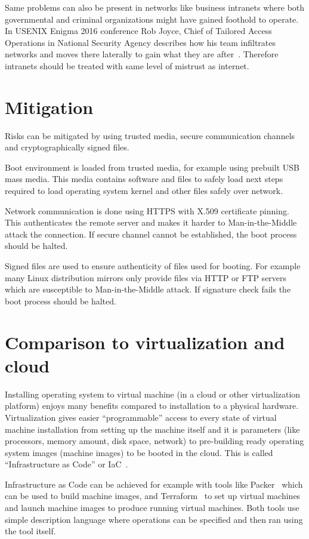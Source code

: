 Same problems can also be present in networks like business intranets
where both governmental and criminal organizations might have gained
foothold to operate. In USENIX Enigma 2016 conference Rob Joyce, Chief
of Tailored Access Operations in National Security Agency describes
how his team infiltrates networks and moves there laterally to gain
what they are after~\cite{nsa-tao}. Therefore intranets should be
treated with same level of mistrust as internet.


\section{Mitigation}

Risks can be mitigated by using trusted media, secure communication
channels and cryptographically signed files.

Boot environment is loaded from trusted media, for example using
prebuilt USB mass media. This media contains software and files to
safely load next steps required to load operating system kernel and
other files safely over network.

Network communication is done using HTTPS with X.509 certificate
pinning. This authenticates the remote server and makes it harder to
Man-in-the-Middle attack the connection. If secure channel cannot be
established, the boot process should be halted.

Signed files are used to ensure authenticity of files used for
booting. For example many Linux distribution mirrors only provide
files via HTTP or FTP servers which are susceptible to
Man-in-the-Middle attack. If signature check fails the boot process
should be halted.


\section{Comparison to virtualization and cloud}

Installing operating system to virtual machine (in a cloud or other
virtualization platform) enjoys many benefits compared to installation
to a physical hardware. Virtualization gives easier ``programmable''
access to every state of virtual machine installation from setting up
the machine itself and it is parameters (like processors, memory
amount, disk space, network) to pre-building ready operating system
images (machine images) to be booted in the cloud. This is called
``Infrastructure as Code'' or IaC~\cite{spinellis}.

Infrastructure as Code can be achieved for example with tools like
Packer~\cite{packer} which can be used to build machine images, and
Terraform~\cite{terraform} to set up virtual machines and launch
machine images to produce running virtual machines. Both tools use
simple description language where operations can be specified and then
ran using the tool itself.

